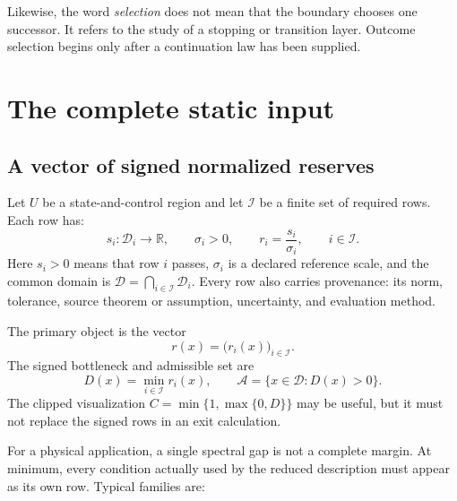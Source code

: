 \documentclass[11pt]{article}
\theoremstyle{definition}
\theoremstyle{remark}
\newcommand{\cA}{\mathcal A}
\newcommand{\cD}{\mathcal D}
\newcommand{\cI}{\mathcal I}
\newcommand{\RR}{\mathbb R}
\begin{document}
Likewise, the word \emph{selection} does not mean that the boundary chooses
one successor.  It refers to the study of a stopping or transition layer.
Outcome selection begins only after a continuation law has been supplied.

\section{The complete static input}
\label{sec:static}

\subsection{A vector of signed normalized reserves}

Let \(U\) be a state-and-control region and let
\(\cI\) be a finite set of required rows.  Each row has:
\[
 s_i:\cD_i\longrightarrow\RR,
 \qquad
 \sigma_i>0,
 \qquad
 r_i=\frac{s_i}{\sigma_i},
 \qquad i\in\cI.
\]
Here \(s_i>0\) means that row \(i\) passes, \(\sigma_i\) is a declared
reference scale, and the common domain is
\(\cD=\bigcap_{i\in\cI}\cD_i\).  Every row also carries provenance:
its norm, tolerance, source theorem or assumption, uncertainty, and
evaluation method.

The primary object is the vector
\[
 r(x)=\bigl(r_i(x)\bigr)_{i\in\cI}.
\]
The signed bottleneck and admissible set are
\begin{equation}
 D(x)=\min_{i\in\cI}r_i(x),
 \qquad
 \cA=\{x\in\cD:D(x)>0\}.
\label{eq:bottleneck}
\end{equation}
The clipped visualization \(C=\min\{1,\max\{0,D\}\}\) may be useful, but it
must not replace the signed rows in an exit calculation.

For a physical application, a single spectral gap is not a complete
margin.  At minimum, every condition actually used by the reduced
description must appear as its own row.  Typical families are:
\end{document}
